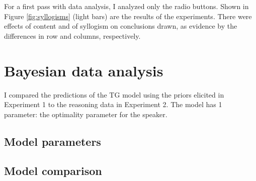 \documentclass{llncs} %
\begin{document}
For a first pass with data analysis, I analyzed only the radio buttons. Shown in Figure \ref{fig:syllogisms} (light bars) are the results of the experiments. There were effects of content and of syllogism on conclusions drawn, as evidence by the differences in row and columns, respectively.

\section{Bayesian data analysis}

I compared the predictions of the TG model using the priors elicited in Experiment 1 to the reasoning data in Experiment 2. The model has 1 parameter: the optimality parameter for the speaker. 

\subsection{Model parameters}

\subsection{Model comparison}
\end{document}
